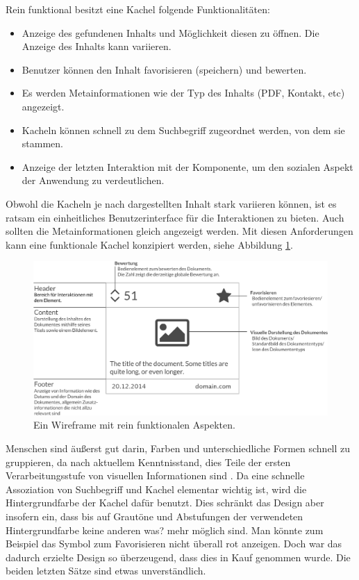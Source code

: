 \documentclass[12pt,twoside]{book}
\begin{document}
Rein funktional besitzt eine Kachel folgende Funktionalitäten:

\begin{itemize}
  \item Anzeige des gefundenen Inhalts und Möglichkeit diesen zu öffnen. Die Anzeige des Inhalts kann variieren.
  \item Benutzer können den Inhalt favorisieren (speichern) und bewerten.
  \item Es werden Metainformationen wie der Typ des Inhalts (PDF, Kontakt, etc) angezeigt.
  \item Kacheln können schnell zu dem Suchbegriff zugeordnet werden, von dem sie stammen.
  \item Anzeige der letzten Interaktion mit der Komponente, um den sozialen Aspekt der Anwendung zu verdeutlichen.
\end{itemize}

Obwohl die Kacheln je nach dargestellten Inhalt stark variieren können, ist es ratsam ein einheitliches Benutzerinterface für die Interaktionen zu bieten. Auch sollten die Metainformationen gleich angezeigt werden.
Mit diesen Anforderungen kann eine funktionale Kachel konzipiert werden, siehe Abbildung \ref{fig:tile_prototype}.

\begin{figure}[htbp]
    \centering
    \includegraphics[width=1.0\textwidth]{images/tiles.eps}
    \caption{Ein Wireframe mit rein funktionalen Aspekten.}
    \label{fig:tile_prototype}
\end{figure}

Menschen sind äußerst gut darin, Farben und unterschiedliche Formen schnell zu gruppieren, da nach aktuellem Kenntnisstand, dies Teile der ersten Verarbeitungsstufe von visuellen Informationen sind \citep{treisman1987merkmale}. Da eine schnelle Assoziation von Suchbegriff und Kachel elementar wichtig ist, wird die Hintergrundfarbe der Kachel dafür benutzt. Dies schränkt das Design aber insofern ein, dass bis auf Grautöne und Abstufungen der verwendeten Hintergrundfarbe keine anderen was? mehr möglich sind. Man könnte zum Beispiel das Symbol zum Favorisieren nicht überall rot anzeigen. Doch war das dadurch erzielte Design so überzeugend, dass dies in Kauf genommen wurde. Die beiden letzten Sätze sind etwas unverständlich.
\end{document}

